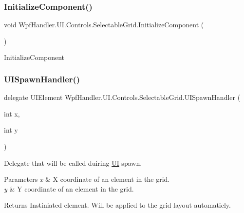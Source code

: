 \subsubsection{\texorpdfstring{Initialize\+Component()}{InitializeComponent()}\hspace{0.1cm}{\footnotesize\ttfamily [4/4]}}
{\footnotesize\ttfamily void Wpf\+Handler.\+U\+I.\+Controls.\+Selectable\+Grid.\+Initialize\+Component (\begin{DoxyParamCaption}{ }\end{DoxyParamCaption})}



Initialize\+Component 

\mbox{\label{class_wpf_handler_1_1_u_i_1_1_controls_1_1_selectable_grid_a62f02ab127d85228321df8aac18c67ac}} 
\subsubsection{\texorpdfstring{U\+I\+Spawn\+Handler()}{UISpawnHandler()}}
{\footnotesize\ttfamily delegate U\+I\+Element Wpf\+Handler.\+U\+I.\+Controls.\+Selectable\+Grid.\+U\+I\+Spawn\+Handler (\begin{DoxyParamCaption}\item[{int}]{x,  }\item[{int}]{y }\end{DoxyParamCaption})}



Delegate that will be called duiring \mbox{\hyperlink{namespace_wpf_handler_1_1_u_i}{UI}} spawn. 


\begin{DoxyParams}{Parameters}
{\em x} & X coordinate of an element in the grid.\\
\hline
{\em y} & Y coordinate of an element in the grid.\\
\hline
\end{DoxyParams}
\begin{DoxyReturn}{Returns}
Instiniated element. Will be applied to the grid layout automaticly.
\end{DoxyReturn}
\mbox{\label{class_wpf_handler_1_1_u_i_1_1_controls_1_1_selectable_grid_a7b3c440a9ab67b44c9b6fc5911cbe07a}} 
